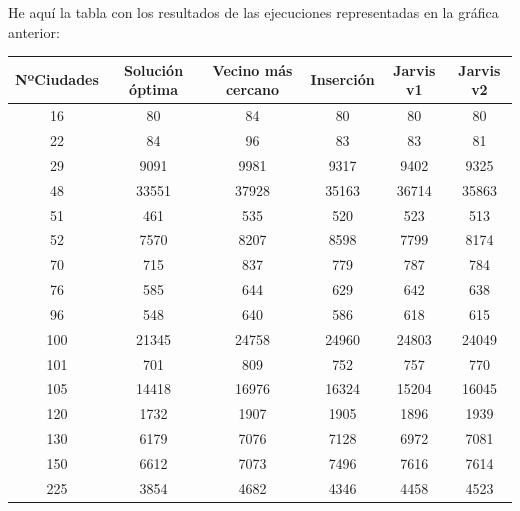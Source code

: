 \documentclass{article}
\begin{document}
He aquí la tabla con los resultados de las ejecuciones representadas en la gráfica anterior:

\begin{longtable}{|c|c|c|c|c|c|}
	\hline
	NºCiudades	& Solución óptima	& Vecino más cercano	& Inserción	& Jarvis v1	& Jarvis v2 \\ \hline
	16	                & 80	            & 84	                & 80	    & 80	            & 80 \\ \hline
	22	                & 84	            & 96	                & 83	    & 83	            & 81 \\ \hline
	29	                & 9091	            & 9981	                & 9317	    & 9402	            & 9325 \\ \hline
	48	                & 33551	            & 37928	                & 35163	    & 36714	            & 35863 \\ \hline
	51	                & 461	            & 535	                & 520	    & 523	            & 513 \\ \hline
	52	                & 7570	            & 8207	                & 8598	    & 7799	            & 8174 \\ \hline
	70	                & 715	            & 837	                & 779	    & 787	            & 784 \\ \hline
	76	                & 585	            & 644	                & 629	    & 642	            & 638 \\ \hline
	96	                & 548	            & 640	                & 586	    & 618	            & 615 \\ \hline
	100	                & 21345	            & 24758	                & 24960	    & 24803	            & 24049 \\ \hline
	101	                & 701	            & 809	                & 752	    & 757	            & 770 \\ \hline
	105	                & 14418	            & 16976	                & 16324	    & 15204	            & 16045 \\ \hline
	120	                & 1732	            & 1907	                & 1905	    & 1896	            & 1939 \\ \hline
	130	                & 6179	            & 7076	                & 7128	    & 6972	            & 7081 \\ \hline
	150	                & 6612	            & 7073	                & 7496	    & 7616	            & 7614 \\ \hline
	225	                & 3854	            & 4682	                & 4346	    & 4458	            & 4523 \\ \hline

\end{longtable}
\end{document}
